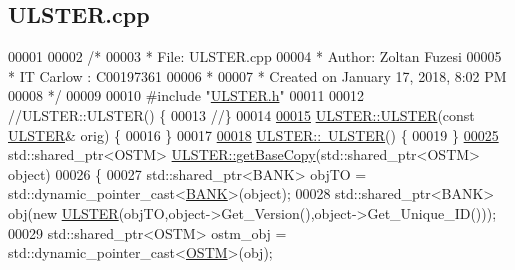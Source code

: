 \hypertarget{_u_l_s_t_e_r_8cpp_source}{}\subsection{U\+L\+S\+T\+E\+R.\+cpp}

\begin{DoxyCode}
00001 
00002 \textcolor{comment}{/* }
00003 \textcolor{comment}{ * File:   ULSTER.cpp}
00004 \textcolor{comment}{ * Author: Zoltan Fuzesi}
00005 \textcolor{comment}{ * IT Carlow : C00197361}
00006 \textcolor{comment}{ *}
00007 \textcolor{comment}{ * Created on January 17, 2018, 8:02 PM}
00008 \textcolor{comment}{ */}
00009 
00010 \textcolor{preprocessor}{#include "\hyperlink{_u_l_s_t_e_r_8h}{ULSTER.h}"}
00011 
00012 \textcolor{comment}{//ULSTER::ULSTER() \{}
00013 \textcolor{comment}{//\}}
00014 
\hypertarget{_u_l_s_t_e_r_8cpp_source.tex_l00015}{}\hyperlink{class_u_l_s_t_e_r_ad8847497742850609cd4748bbb6d0a8e_ad8847497742850609cd4748bbb6d0a8e}{00015} \hyperlink{class_u_l_s_t_e_r_a637ad8cb5537167ab51cd079637a8323_a637ad8cb5537167ab51cd079637a8323}{ULSTER::ULSTER}(\textcolor{keyword}{const} \hyperlink{class_u_l_s_t_e_r}{ULSTER}& orig) \{
00016 \}
00017 
\hypertarget{_u_l_s_t_e_r_8cpp_source.tex_l00018}{}\hyperlink{class_u_l_s_t_e_r_a4ceb68bdbc806f74f9e55096f8223453_a4ceb68bdbc806f74f9e55096f8223453}{00018} \hyperlink{class_u_l_s_t_e_r_a4ceb68bdbc806f74f9e55096f8223453_a4ceb68bdbc806f74f9e55096f8223453}{ULSTER::~ULSTER}() \{
00019 \}
\hypertarget{_u_l_s_t_e_r_8cpp_source.tex_l00025}{}\hyperlink{class_u_l_s_t_e_r_ad0c05e562b0c67283edfa4940c9aa728_ad0c05e562b0c67283edfa4940c9aa728}{00025} std::shared\_ptr<OSTM> \hyperlink{class_u_l_s_t_e_r_ad0c05e562b0c67283edfa4940c9aa728_ad0c05e562b0c67283edfa4940c9aa728}{ULSTER::getBaseCopy}(std::shared\_ptr<OSTM> \textcolor{keywordtype}{object})
00026 \{
00027     std::shared\_ptr<BANK> objTO = std::dynamic\_pointer\_cast<\hyperlink{class_b_a_n_k}{BANK}>(object);
00028     std::shared\_ptr<BANK> obj(\textcolor{keyword}{new} \hyperlink{class_u_l_s_t_e_r_a637ad8cb5537167ab51cd079637a8323_a637ad8cb5537167ab51cd079637a8323}{ULSTER}(objTO,object->Get\_Version(),\textcolor{keywordtype}{object}->Get\_Unique\_ID())); 
00029     std::shared\_ptr<OSTM> ostm\_obj = std::dynamic\_pointer\_cast<\hyperlink{class_o_s_t_m}{OSTM}>(obj);                             
           

\end{DoxyCode}
